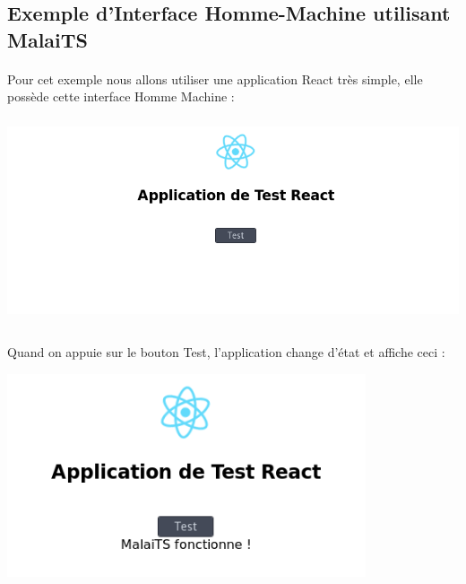 \documentclass[11pt, a4paper, pdftex]{article}
\begin{document}
\begin{appendices}
        \section{Exemple d'Interface Homme-Machine utilisant MalaiTS}\label{sec:expmalai}
            \paragraph{}
                Pour cet exemple nous allons utiliser une application React très simple, elle possède cette interface Homme Machine : \\
        \vspace{0.5cm}
        \begin{minipage}{\linewidth}
            \centering
            \includegraphics[height=6.0cm]{../assets/exempleinit.png}
        \end{minipage}
        \paragraph{}
            Quand on appuie sur le bouton Test, l'application change d'état et affiche ceci : \\
        \vspace{0.5cm}
        \begin{minipage}{\linewidth}
            \centering
            \includegraphics[height=6.0cm]{../assets/exempleend.png}
        \end{minipage}

\end{appendices}
\end{document}
